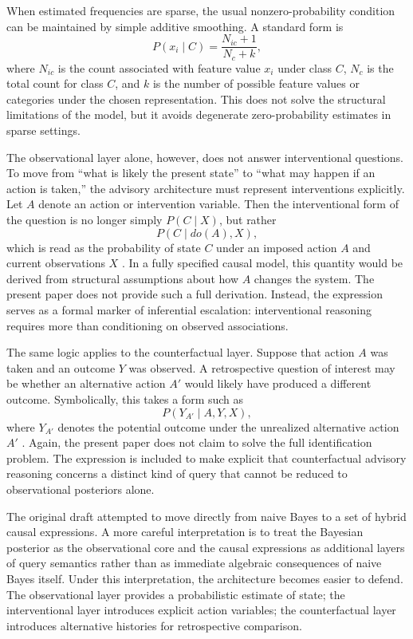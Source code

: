 \documentclass[11pt]{article}
\begin{document}
When estimated frequencies are sparse, the usual nonzero-probability condition can be maintained by simple additive smoothing. A standard form is
\begin{equation}
P(x_i \mid C) = \frac{N_{ic}+1}{N_c + k},
\end{equation}
where $N_{ic}$ is the count associated with feature value $x_i$ under class $C$, $N_c$ is the total count for class $C$, and $k$ is the number of possible feature values or categories under the chosen representation. This does not solve the structural limitations of the model, but it avoids degenerate zero-probability estimates in sparse settings.

The observational layer alone, however, does not answer interventional questions. To move from ``what is likely the present state'' to ``what may happen if an action is taken,'' the advisory architecture must represent interventions explicitly. Let $A$ denote an action or intervention variable. Then the interventional form of the question is no longer simply $P(C \mid X)$, but rather
\begin{equation}
P(C \mid do(A), X),
\end{equation}
which is read as the probability of state $C$ under an imposed action $A$ and current observations $X$ \citep{pearl2000}. In a fully specified causal model, this quantity would be derived from structural assumptions about how $A$ changes the system. The present paper does not provide such a full derivation. Instead, the expression serves as a formal marker of inferential escalation: interventional reasoning requires more than conditioning on observed associations.

The same logic applies to the counterfactual layer. Suppose that action $A$ was taken and an outcome $Y$ was observed. A retrospective question of interest may be whether an alternative action $A'$ would likely have produced a different outcome. Symbolically, this takes a form such as
\begin{equation}
P(Y_{A'} \mid A, Y, X),
\end{equation}
where $Y_{A'}$ denotes the potential outcome under the unrealized alternative action $A'$ \citep{pearl2000}. Again, the present paper does not claim to solve the full identification problem. The expression is included to make explicit that counterfactual advisory reasoning concerns a distinct kind of query that cannot be reduced to observational posteriors alone.

The original draft attempted to move directly from naive Bayes to a set of hybrid causal expressions. A more careful interpretation is to treat the Bayesian posterior as the observational core and the causal expressions as additional layers of query semantics rather than as immediate algebraic consequences of naive Bayes itself. Under this interpretation, the architecture becomes easier to defend. The observational layer provides a probabilistic estimate of state; the interventional layer introduces explicit action variables; the counterfactual layer introduces alternative histories for retrospective comparison.
\end{document}
